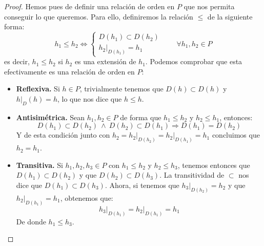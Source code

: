 \begin{teo}
\begin{proof}
        \noindent
        Hemos pues de definir una relación de orden en $P$ que nos permita conseguir lo que queremos. Para ello, definiremos la relación $\leq$ de la siguiente forma:
        \begin{equation*}
            h_1 \leq h_2 \Longleftrightarrow \left\{\begin{array}{l}
                D(h_1) \subset D(h_2) \\
                h_2\big|_{D(h_1)} = h_1
            \end{array}\right. \qquad \forall h_1,h_2\in P
        \end{equation*}
        es decir, $h_1\leq h_2$ si $h_2$ es una extensión de $h_1$. Podemos comprobar que esta efectivamente es una relación de orden en $P$:
        \begin{itemize}
            \item \textbf{Reflexiva.} Si $h\in P$, trivialmente tenemos que $D(h)\subset D(h)$ y $h\big|_D(h) = h$, lo que nos dice que $h\leq h$.
            \item \textbf{Antisimétrica.} Sean $h_1,h_2\in P$ de forma que $h_1\leq h_2$ y $h_2\leq h_1$, entonces:
                \begin{equation*}
                    D(h_1)\subset D(h_2) \ \land\ D(h_2) \subset D(h_1) \Longrightarrow D(h_1) = D(h_2) 
                \end{equation*}
                Y de esta condición junto con $h_2 = h_2\big|_{D(h_2)} = h_2\big|_{D(h_1)} = h_1$ concluimos que $h_2 = h_1$.
            \item \textbf{Transitiva.} Si $h_1,h_2,h_3\in P$ con $h_1\leq h_2$ y $h_2\leq h_3$, tenemos entonces que $D(h_1)\subset D(h_2)$ y que $D(h_2)\subset D(h_3)$. La transitividad de $\subset$ nos dice que $D(h_1)\subset D(h_3)$. Ahora, si tenemos que $h_3\big|_{D(h_2)} = h_2$ y que $h_2\big|_{D(h_1)} = h_1$, obtenemos que:
                \begin{equation*}
                    h_3\big|_{D(h_1)} = h_2\big|_{D(h_1)} = h_1
                \end{equation*}
                De donde $h_1\leq h_3$.
        \end{itemize}


\end{proof}
\end{teo}
